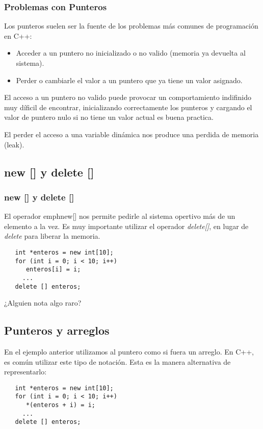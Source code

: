 \documentclass{beamer}
\begin{document}
\begin{frame}[fragile]
\frametitle{Problemas con Punteros}
Los punteros suelen ser la fuente de los problemas más comunes de programación en C++:

\begin{itemize}
 \item Acceder a un puntero no inicializado o no valido (memoria ya devuelta al sistema).
 \item Perder o cambiarle el valor a un puntero que ya tiene un valor asignado.
\end{itemize}

El acceso a un puntero no valido puede provocar un comportamiento indifinido muy díficil de encontrar, inicializando correctamente los punteros y cargando el valor de puntero nulo si no tiene un valor actual es buena practica.

El perder el acceso a una variable dinámica nos produce una perdida de memoria (leak).

\end{frame}

\subsection{new [] y delete []}
\begin{frame}[fragile]
\frametitle{new [] y delete []}

El operador emph{new[]} nos permite pedirle al sistema opertivo más de un elemento a la vez.
Es muy importante utilizar el operador \emph{delete[]}, en lugar de \emph{delete} para liberar la memoria.
\begin{verbatim}
   int *enteros = new int[10];
   for (int i = 0; i < 10; i++)
      enteros[i] = i;
     ...
   delete [] enteros;
\end{verbatim}

¿Alguien nota algo raro?
\end{frame}

\subsection{Punteros y arreglos}
\begin{frame}
En el ejemplo anterior utilizamos al puntero como si fuera un arreglo.
En C++, es común utilizar este tipo de notación.
Esta es la manera alternativa de representarlo:
\begin{verbatim}
   int *enteros = new int[10];
   for (int i = 0; i < 10; i++)
      *(enteros + i) = i;
     ...
   delete [] enteros;
 
\end{verbatim}

\end{frame}
\end{document}
